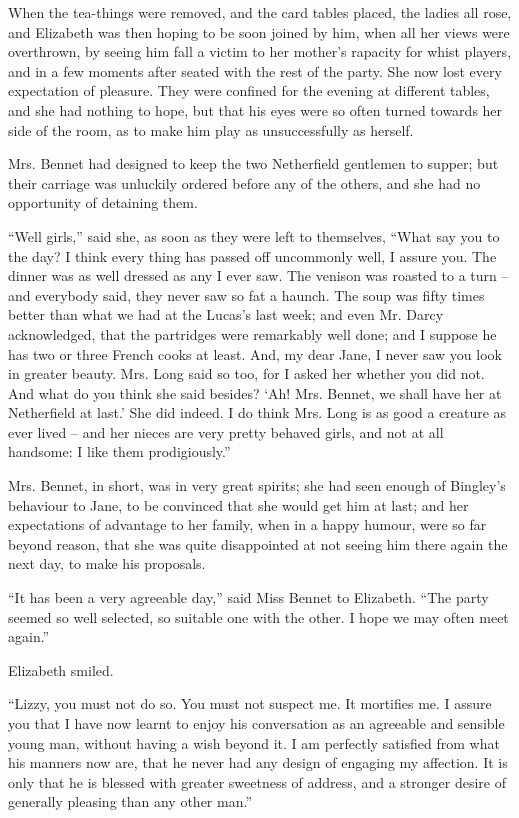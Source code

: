 When the tea-things were removed, and the card tables
placed, the ladies all rose, and Elizabeth was then hoping
to be soon joined by him, when all her views were overthrown,
by seeing him fall a victim to her mother’s rapacity
for whist players, and in a few moments after seated with
the rest of the party. She now lost every expectation of
pleasure. They were confined for the evening at different
tables, and she had nothing to hope, but that his eyes
were so often turned towards her side of the room, as to
make him play as unsuccessfully as herself.

Mrs. Bennet had designed to keep the two Netherfield
gentlemen to supper; but their carriage was unluckily
ordered before any of the others, and she had no opportunity
of detaining them.

“Well girls,” said she, as soon as they were left to
themselves, “What say you to the day? I think every
thing has passed off uncommonly well, I assure you. The
dinner was as well dressed as any I ever saw. The venison
was roasted to a turn -- and everybody said, they never
saw so fat a haunch. The soup was fifty times better
than what we had at the Lucas’s last week; and even
Mr. Darcy acknowledged, that the partridges were remarkably
well done; and I suppose he has two or three French
cooks at least. And, my dear Jane, I never saw you look
in greater beauty. Mrs. Long said so too, for I asked her
whether you did not. And what do you think she said
besides? ‘Ah! Mrs. Bennet, we shall have her at Netherfield
at last.’ She did indeed. I do think Mrs. Long is
as good a creature as ever lived -- and her nieces are very
pretty behaved girls, and not at all handsome: I like
them prodigiously.”

Mrs. Bennet, in short, was in very great spirits; she
had seen enough of Bingley’s behaviour to Jane, to be
convinced that she would get him at last; and her expectations
of advantage to her family, when in a happy
humour, were so far beyond reason, that she was quite
disappointed at not seeing him there again the next day,
to make his proposals.

“It has been a very agreeable day,” said Miss Bennet
to Elizabeth. “The party seemed so well selected, so
suitable one with the other. I hope we may often meet
again.”

Elizabeth smiled.

“Lizzy, you must not do so. You must not suspect
me. It mortifies me. I assure you that I have now learnt
to enjoy his conversation as an agreeable and sensible
young man, without having a wish beyond it. I am perfectly
satisfied from what his manners now are, that he never
had any design of engaging my affection. It is only that
he is blessed with greater sweetness of address, and a
stronger desire of generally pleasing than any other man.”

